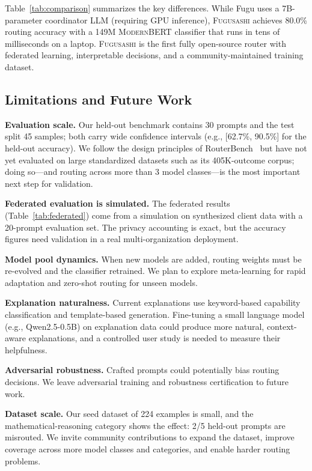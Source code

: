 \documentclass[11pt,a4paper]{article}
\newcommand{\fugusashi}{\textsc{Fugusashi}}
\newcommand{\modernbert}{\textsc{ModernBERT}}
\begin{document}
Table~\ref{tab:comparison} summarizes the key differences.
While Fugu uses a 7B-parameter coordinator LLM (requiring GPU inference), \fugusashi{} achieves 80.0\% routing accuracy with a 149M \modernbert{} classifier that runs in tens of milliseconds on a laptop.
\fugusashi{} is the first fully open-source router with federated learning, interpretable decisions, and a community-maintained training dataset.

\subsection{Limitations and Future Work}

\textbf{Evaluation scale.}
Our held-out benchmark contains 30 prompts and the test split 45 samples; both carry wide confidence intervals (e.g., [62.7\%, 90.5\%] for the held-out accuracy).
We follow the design principles of RouterBench~\cite{routerbench2024} but have not yet evaluated on large standardized datasets such as its 405K-outcome corpus; doing so---and routing across more than 3 model classes---is the most important next step for validation.

\textbf{Federated evaluation is simulated.}
The federated results (Table~\ref{tab:federated}) come from a simulation on synthesized client data with a 20-prompt evaluation set.
The privacy accounting is exact, but the accuracy figures need validation in a real multi-organization deployment.

\textbf{Model pool dynamics.}
When new models are added, routing weights must be re-evolved and the classifier retrained.
We plan to explore meta-learning for rapid adaptation and zero-shot routing for unseen models.

\textbf{Explanation naturalness.}
Current explanations use keyword-based capability classification and template-based generation.
Fine-tuning a small language model (e.g., Qwen2.5-0.5B) on explanation data could produce more natural, context-aware explanations, and a controlled user study is needed to measure their helpfulness.

\textbf{Adversarial robustness.}
Crafted prompts could potentially bias routing decisions.
We leave adversarial training and robustness certification to future work.

\textbf{Dataset scale.}
Our seed dataset of 224 examples is small, and the mathematical-reasoning category shows the effect: 2/5 held-out prompts are misrouted.
We invite community contributions to expand the dataset, improve coverage across more model classes and categories, and enable harder routing problems.
\end{document}
